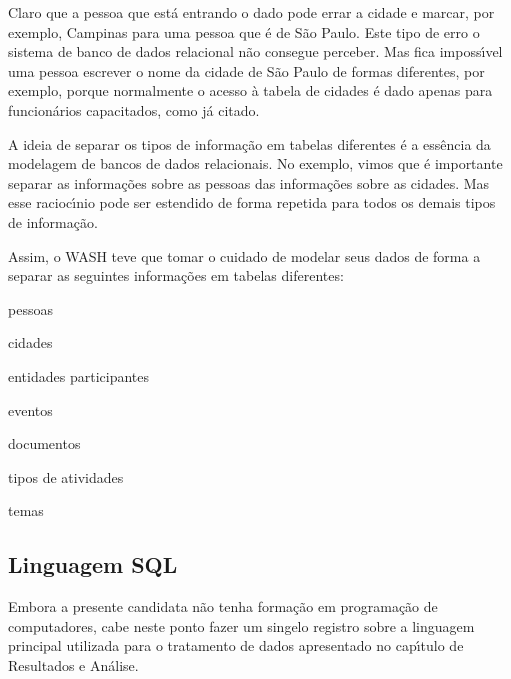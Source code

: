 \documentclass[
12pt,		%
openright,	%
twoside,  %
a4paper,			%
chapter=TITLE,		%
english,			%
french,				%
spanish,			%
brazil				%
]{USPSC-classe/USPSC}
\begin{document}
Claro que a pessoa que est\'a entrando o dado pode errar a cidade e marcar, por exemplo, Campinas para uma pessoa que \'e de S\~ao Paulo. Este tipo de erro o sistema de banco de dados relacional n\~ao consegue perceber. Mas fica imposs\'{\i}vel uma pessoa escrever o nome da cidade de S\~ao Paulo de formas diferentes, por exemplo, porque normalmente o acesso \`a tabela de cidades \'e dado apenas para funcion\'arios capacitados, como j\'a citado.










A ideia de separar os tipos de informa\c{c}\~ao em tabelas diferentes \'e a ess\^encia da modelagem de bancos de dados relacionais. No exemplo, vimos que \'e importante separar as informa\c{c}\~oes sobre as pessoas das informa\c{c}\~oes sobre as cidades. Mas esse racioc\'{\i}nio pode ser estendido de forma repetida para todos os demais tipos de informa\c{c}\~ao.










Assim, o WASH teve que tomar o cuidado de modelar seus dados de forma a separar as seguintes informa\c{c}\~oes em tabelas diferentes:











\begin{alineas}
\item pessoas
\item cidades
\item entidades participantes
\item eventos
\item documentos
\item tipos de atividades
\item temas
\end{alineas}

\subsection[Linguagem SQL]{Linguagem SQL}\label{Linguagem SQL}
Embora a presente candidata n\~ao tenha forma\c{c}\~ao em programa\c{c}\~ao de computadores, cabe neste ponto fazer um singelo registro sobre a linguagem principal utilizada para o tratamento de dados apresentado no cap\'{\i}tulo de \textquotedbl Resultados e An\'alise\textquotedbl .
\end{document}
